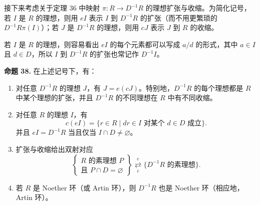 接下来考虑关于定理 36 中映射 $\pi:R\to D^{-1}R$ 的理想扩张与收缩。为简化记号，若 $I$ 是 $R$ 的理想，则用 $eI$ 表示 $I$ 到 $D^{-1}R$ 的扩张（而不用更繁琐的 $D^{-1}R\pi(I)$）；若 $J$ 是 $D^{-1}R$ 的理想，则用 $cJ$ 表示 $J$ 到 $R$ 的收缩。

若 $I$ 是 $R$ 的理想，则容易看出 $eI$ 的每个元素都可以写成 $a/d$ 的形式，其中 $a\in I$ 且 $d\in D$，所以 $I$ 到 $D^{-1}R$ 的扩张也常记作 $D^{-1}I$。

\noindent\textbf{命题 38.} 在上述记号下，有：
\begin{enumerate}[label=(\arabic*)]
	\item 对任意 $D^{-1}R$ 的理想 $J$，有 $J=e(cJ)$。特别地，$D^{-1}R$ 的每个理想都是 $R$ 中某个理想的扩张，并且 $D^{-1}R$ 的不同理想在 $R$ 中有不同收缩。
	\item 对任意 $R$ 的理想 $I$，有
	\[
	c(eI)=\{r\in R\mid dr\in I\text{ 对某个 }d\in D\text{ 成立}\}.
	\]
	并且 $eI=D^{-1}R$ 当且仅当 $I\cap D\ne\varnothing$。
	\item 扩张与收缩给出双射对应
	\[
	\left\{\begin{array}{c}
		R\text{ 的素理想 }P\\
		\text{且 }P\cap D=\varnothing
	\end{array}\right\}
	\overset{e}{\underset{c}{\rightleftarrows}}
	\{D^{-1}R\text{ 的素理想}\}.
	\]
	\item 若 $R$ 是 Noether 环（或 Artin 环），则 $D^{-1}R$ 也是 Noether 环（相应地，Artin 环）。
\end{enumerate}

